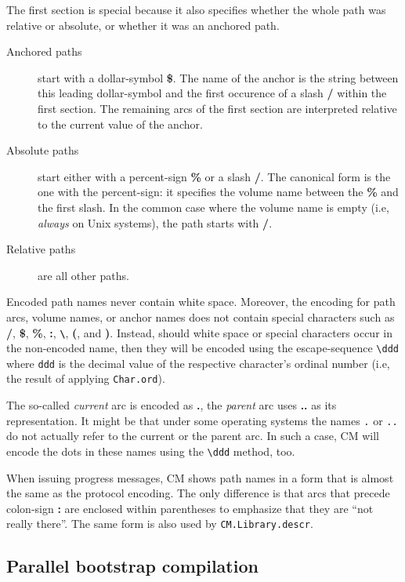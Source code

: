 \documentclass[titlepage,letterpaper]{article}
\begin{document}
The first section is special because it also specifies whether the
whole path was relative or absolute, or whether it was an anchored
path.

\begin{description}
\item[Anchored paths] start with a dollar-symbol {\bf \$}.  The name
of the anchor is the string between this leading dollar-symbol and the
first occurence of a slash {\bf /} within the first section.  The
remaining arcs of the first section are interpreted relative to the
current value of the anchor.
\item[Absolute paths] start either with a percent-sign {\bf \%} or a
slash {\bf /}.  The canonical form is the one with the percent-sign:
it specifies the volume name between the {\bf \%} and the first slash.
In the common case where the volume name is empty (i.e, {\em always} on
Unix systems), the path starts with {\bf /}.
\item[Relative paths] are all other paths.
\end{description}

Encoded path names never contain white space.  Moreover, the encoding
for path arcs, volume names, or anchor names does not contain special
characters such as {\bf /}, {\bf \$}, {\bf \%}, {\bf :}, {\bf
\verb|\|}, {\bf (}, and {\bf )}.  Instead, should white space or
special characters occur in the non-encoded name, then they will be
encoded using the escape-sequence \verb|\ddd| where {\tt ddd} is the
decimal value of the respective character's ordinal number (i.e, the
result of applying {\tt Char.ord}).

The so-called {\em current} arc is encoded as {\bf .}, the {\em
parent} arc uses {\bf ..} as its representation.  It might be that
under some operating systems the names {\tt .} or {\tt ..} do not
actually refer to the current or the parent arc.  In such a case, CM
will encode the dots in these names using the \verb|\ddd| method, too.

When issuing progress messages, CM shows path names in a form that is
almost the same as the protocol encoding.  The only difference is that
arcs that precede colon-sign {\bf :} are enclosed within parentheses
to emphasize that they are ``not really there''.  The same form is
also used by {\tt CM.Library.descr}.

\subsection{Parallel bootstrap compilation}
\end{document}
